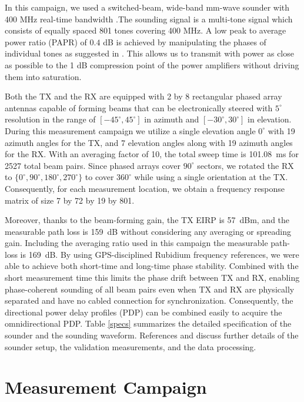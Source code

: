 \documentclass[conference]{IEEEtran}
\begin{document}
In this campaign, we used a switched-beam, wide-band mm-wave sounder with 400 MHz real-time bandwidth \cite{bas_2017_realtime}.The sounding signal is a multi-tone signal which consists of equally spaced 801 tones covering 400 MHz. A low peak to average power ratio (PAPR) of $0.4$ dB is achieved by manipulating the phases of individual tones as suggested in \cite{Friese1997multitone}. This allows us to transmit with power as close as possible to the 1 dB compression point of the power amplifiers without driving them into saturation.  

Both the TX and the RX are equipped with 2 by 8 rectangular phased array antennas capable of forming beams that can be electronically steered with $5^{\circ}$ resolution in the range of $[-45^{\circ}, 45^{\circ}]$ in azimuth and $[-30^{\circ}, 30^{\circ}]$ in elevation. During this measurement campaign we utilize a single elevation angle $0^{\circ}$ with 19 azimuth angles for the TX, and 7 elevation angles along with 19 azimuth angles for the RX. With an averaging factor of 10, the total sweep time is \SI{101.08}{ms} for 2527 total beam pairs. Since phased arrays cover $90^{\circ}$ sectors, we rotated the RX to $\{0^{\circ},90^{\circ},180^{\circ},270^{\circ}\}$ to cover $360^{\circ}$ while using a single orientation at the TX. Consequently, for each measurement location, we obtain a frequency response matrix of size 7 by 72 by 19 by 801.  

Moreover, thanks to the beam-forming gain, the TX EIRP is \SI{57}{dBm}, and the measurable path loss is \SI{159}{dB} without considering any averaging or spreading gain. Including the averaging ratio used in this campaign the measurable path-loss is \SI{169}{dB}. By using GPS-disciplined Rubidium frequency references, we were able to achieve both short-time and long-time phase stability. Combined with the short measurement time this limits the phase drift between TX and RX, enabling phase-coherent sounding of all beam pairs even when TX and RX are physically separated and have no cabled connection for synchronization. Consequently, the directional power delay profiles (PDP) can be combined easily to acquire the omnidirectional PDP. Table \ref{specs} summarizes the detailed specification of the sounder and the sounding waveform. References \cite{bas_2017_realtime} and \cite{bas_realjournal_2017} discuss further details of the sounder setup, the validation measurements, and the data processing. 



\section{Measurement Campaign} \label{sec:meas}
\end{document}
